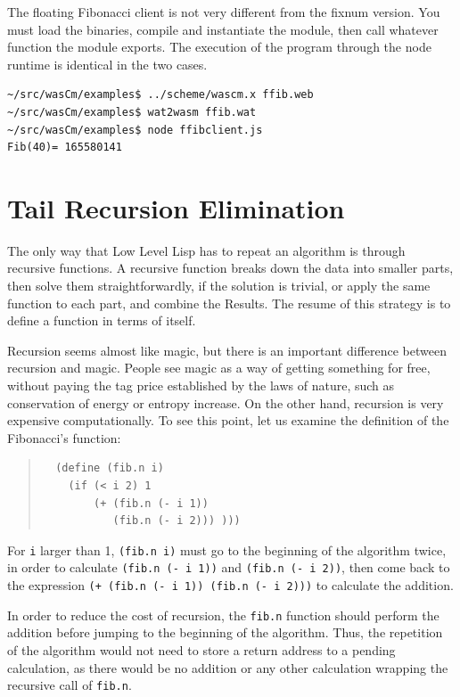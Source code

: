 \documentclass[a4paper,12pt]{book}
\begin{document}
The floating Fibonacci client is not very different
from the fixnum version. You must load the binaries,
compile and instantiate the module, then call
whatever function the module exports. The execution
of the program through the node runtime is identical
in the two cases.
\begin{verbatim}
~/src/wasCm/examples$ ../scheme/wascm.x ffib.web
~/src/wasCm/examples$ wat2wasm ffib.wat
~/src/wasCm/examples$ node ffibclient.js
Fib(40)= 165580141
\end{verbatim}

\section{Tail Recursion Elimination}
The only way that Low Level Lisp has
to repeat an algorithm is through
recursive functions. A recursive function 
breaks down the data into smaller parts,
then solve them straightforwardly,
if the solution is trivial, or apply
the same function to each part, and combine
the Results. The resume of this strategy
is to define a function in terms of itself.

Recursion seems almost like magic, but there
is an important difference between recursion
and magic. People see magic as a way of getting
something for free, without paying the tag price
established by the laws of nature, such as 
conservation of energy or entropy increase.
On the other hand, recursion is very expensive
computationally. To see this point, let us examine
the definition of the Fibonacci's function:
\begin{quote}
\begin{verbatim}
  (define (fib.n i)
    (if (< i 2) 1
        (+ (fib.n (- i 1))
           (fib.n (- i 2))) )))
\end{verbatim}
\end{quote}
For \verb|i| larger than 1, \verb|(fib.n i)| must
go to the beginning of the algorithm twice,
in order to calculate \verb|(fib.n (- i 1))|
and \verb|(fib.n (- i 2))|, then come back
to the expression
\verb|(+ (fib.n (- i 1)) (fib.n (- i 2)))|
to calculate the addition.

In order to reduce the cost of recursion, the
\verb|fib.n| function should perform the addition
before jumping to the beginning of the algorithm.
Thus, the repetition of the
algorithm would not need to store a return address
to a pending calculation, as there would be no addition
or any other calculation wrapping the recursive
call of \verb|fib.n|. 
\end{document}
